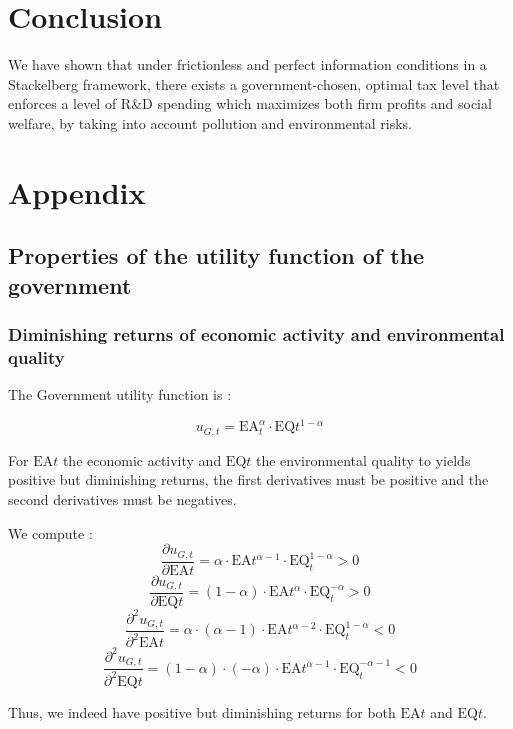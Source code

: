 \documentclass{article}
\begin{document}
\section{Conclusion}
We have shown that under frictionless and perfect information conditions in a Stackelberg framework, there exists a government-chosen, optimal tax level that enforces a level of R\&D spending which maximizes both firm profits and social welfare, by taking into account pollution and environmental risks. \\

\pagebreak
\section{Appendix}

\subsection{Properties of the utility function of the government}

\subsubsection{Diminishing returns of economic activity and environmental quality}
\label{sec:properties_utility_function_gov_1}
The Government utility function is :

\begin{equation}\tag{4}
    u_{G,t}=\text{EA}_{t}^{\alpha}\cdot\text{EQ}{t}^{1-\alpha}
\end{equation}

For $\text{EA}{t}$ the economic activity and $\text{EQ}{t}$ the environmental quality to yields positive but diminishing returns, the first derivatives must be positive and the second derivatives must be negatives. 

We compute : 
$$\frac{\partial u_{G,t}}{\partial \text{EA}{t}}=\alpha\cdot\text{EA}{t}^{\alpha-1}\cdot\text{EQ}_{t}^{1-\alpha}>0$$
$$\frac{\partial u_{G,t}}{\partial \text{EQ}{t}}=(1-\alpha)\cdot\text{EA}{t}^{\alpha}\cdot\text{EQ}_{t}^{-\alpha}>0$$
$$\frac{\partial^2 u_{G,t}}{\partial^2 \text{EA}{t}}=\alpha\cdot(\alpha-1)\cdot\text{EA}{t}^{\alpha-2}\cdot\text{EQ}_{t}^{1-\alpha}<0$$
$$\frac{\partial^2 u_{G,t}}{\partial^2 \text{EQ}{t}}=(1-\alpha)\cdot(-\alpha)\cdot\text{EA}{t}^{\alpha-1}\cdot\text{EQ}_{t}^{-\alpha-1}<0$$

Thus, we indeed have positive but diminishing returns for both $\text{EA}{t}$ and $\text{EQ}{t}$.
\end{document}
